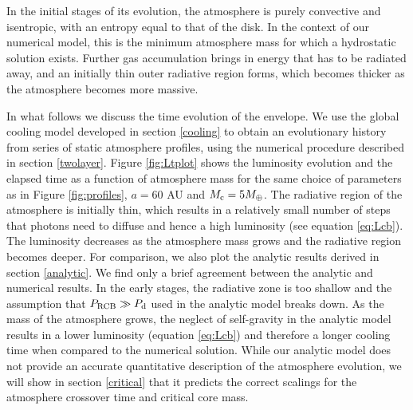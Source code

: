 \documentclass[apj]{emulateapj}
\begin{document}
In the initial stages of its evolution, the atmosphere is purely convective and isentropic, with an entropy equal to that of the disk. In the context of our numerical model, this is the minimum atmosphere mass for which a hydrostatic solution exists. Further gas accumulation brings in energy that has to be radiated away, and an initially thin outer radiative region forms, which becomes thicker as the atmosphere becomes more massive. 



In what follows we discuss the time evolution of the envelope. We use the global cooling model developed in section \ref{cooling} to obtain an evolutionary history from series of static atmosphere profiles, using the numerical procedure described in section \ref{twolayer}. Figure \ref{fig:Ltplot} shows the luminosity evolution and the elapsed time as a function of atmosphere mass for the same choice of parameters as in Figure \ref{fig:profiles}, $a=60$ AU and $M_{\rm c}=5 M_{\oplus}$. The radiative region of the atmosphere is initially thin, which results in a relatively small number of steps that photons need to diffuse and hence a high luminosity (see equation \ref{eq:Lcb}). The luminosity decreases as the atmosphere mass grows and the radiative region becomes deeper. For comparison, we also plot the analytic results derived in section \ref{analytic}. We find only a brief agreement between the analytic and numerical results. In the early stages, the radiative zone is too shallow and the assumption that $P_{\rm RCB} \gg P_{\rm d}$ used in the analytic model breaks down. As the mass of the atmosphere grows, the neglect of self-gravity in the analytic model results in a lower luminosity (equation \ref{eq:Lcb}) and therefore a longer cooling time when compared to the numerical solution. While our analytic model does not provide an accurate quantitative description of the atmosphere evolution, we will show in section \ref{critical} that it predicts the correct scalings for the atmosphere crossover time and critical core mass.  %
\end{document}
